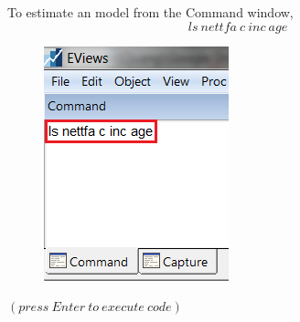 \documentclass[12pt]{report}
\begin{document}
\noindent To estimate an model from the Command window,
$$ls\ nettfa\ c\ inc\ age$$
\begin{figure}[H]
	\centering
	\includegraphics{tute6_q3_4}
\end{figure}
\vspace{-\baselineskip}\centering $(press\ Enter\ to\ execute\ code)$
\justify 
\end{document}
